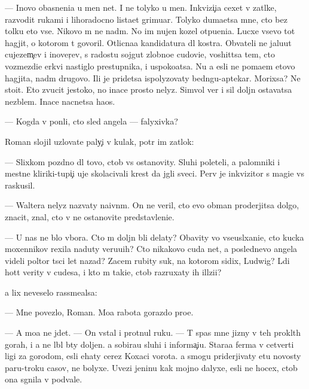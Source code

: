 \documentclass[10pt]{book}
\begin{document}
— Inovo ob{\y}asneni{\y}a u men{\ia} net. I ne tolyko u men{\ia}. Inkvizi{\c}i{\y}a cexet v zat{\yi}lke, razvodit rukami i lihoradocno lista{\y}et grimuar{\yi}. Tolyko duma{\y}etsa mne, cto bez tolku eto vse. Nikovo m{\yi} ne na{\y}d{\e}m. No im nujen kozel otpu{\x}eni{\y}a. Lucxe vsevo tot hagjit, o kotorom t{\yi} govoril. Otlicna{\y}a kandidatura dl{\ia} kostra. Ob{\yi}vateli ne jalu{\y}ut cujezem{\c}ev i inover{\c}ev, s radost{\y}u sojgut zlobno{\y}e cudovi{\x}e, voshit{\ia}tsa tem, cto vozmezdi{\y}e {\C}erkvi nastiglo prestupnika, i uspoko{\y}atsa. Nu a {\y}esli ne po{\y}ma{\y}em etovo hagjita, na{\y}d{\e}m drugovo. Ili je pridetsa ispolyzovaty bedn{\ia}gu-aptekar{\ia}. Mor{\x}ixsa? Ne sto{\y}it. Eto zvucit jestoko, no inace prosto nelyz{\ia}. Simvol{\yi} ver{\yi} i sil{\yi} doljn{\yi} ostavatsa nez{\yi}blem{\yi}. Inace nacnetsa haos.

— Kogda v{\yi} pon{\ia}li, cto sled angela — falyxivka?

Roman slojil uzlovat{\yi}{\y}e paly{\c}i v kulak, pot{\e}r im zat{\yi}lok:

— Slixkom pozdno dl{\ia} tovo, ctob{\yi} vs{\e} ostanovity. Sluhi poleteli, a palomniki i mestn{\yi}{\y}e kliriki-tupi{\c}i uje skolacivali krest da jgli sveci. Perv{\yi}{\y} je inkvizitor s magi{\y}e{\y} vs{\e} raskusil.

— Waltera nelyz{\ia} nazvaty naivn{\yi}m. On ne veril, cto {\y}evo obman proderjitsa dolgo, znacit, znal, cto v{\yi} ne ostanovite predstavleni{\y}e.

— U nas ne b{\yi}lo v{\yi}bora. Cto m{\yi} doljn{\yi} b{\yi}li delaty? Ob{\y}avity vo vseusl{\yi}xani{\y}e, cto kucka moxennikov rexila naduty veru{\y}u{\x}ih? Cto nikakovo cuda net, a poslednevo angela videli poltor{\yi} t{\yi}s{\ia}ci let nazad? Zacem rubity suk, na kotorom sidix, Ludwig? L{\iu}di hot{\ia}t verity v cudesa, i kto m{\yi} taki{\y}e, ctob{\yi} razruxaty ih ill{\iu}zi{\y}i?

{\Y}a lix neveselo rassme{\y}alsa:

— Mne povezlo, Roman. Mo{\y}a rabota gorazdo pro{\x}e.

— A mo{\y}a ne jdet. — On vstal i prot{\ia}nul ruku. — T{\yi} spas mne jizny v teh prokl{\ia}t{\yi}h gorah, i {\y}a ne l{\iu}bl{\iu} b{\yi}ty doljen. {\Y}a sobira{\y}u sluhi i informa{\c}i{\y}u. Stara{\y}a ferma v cetverti ligi za gorodom, {\y}esli {\y}ehaty cerez Koxac{\yf}i vorota. {\Y}a smogu priderjivaty etu novosty paru-tro{\y}ku casov, ne bolyxe. Uvezi jen{\x}inu kak mojno dalyxe, {\y}esli ne hocex, ctob{\yi} ona sgnila v podvale.
\end{document}
